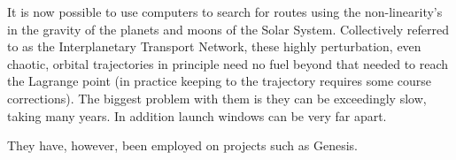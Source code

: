 \documentclass[12pt]{article}
\begin{document}
It is now possible to use computers to search for routes using the
non-linearity's in the gravity of the planets and moons of the Solar System.
Collectively referred to as the Interplanetary Transport Network, these highly
perturbation, even chaotic, orbital trajectories in principle need no fuel
beyond that needed to reach the Lagrange point (in practice keeping to the
trajectory requires some course corrections). The biggest problem with them is
they can be exceedingly slow, taking many years. In addition launch windows can
be very far apart.

They have, however, been employed on projects such as Genesis.
\end{document}

